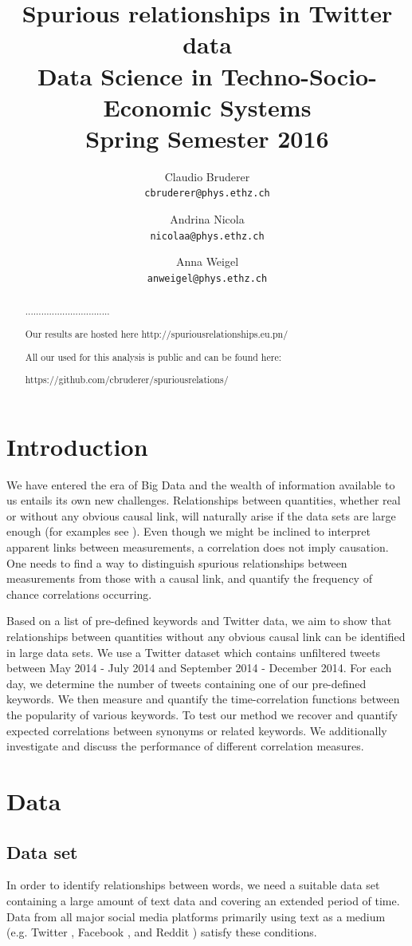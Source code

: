 \documentclass[12pt, a4paper]{article}
\author{
	Claudio Bruderer\\
	\texttt{cbruderer@phys.ethz.ch}
	\and
	Andrina Nicola\\
	\texttt{nicolaa@phys.ethz.ch}
	\and
	Anna Weigel\\
	\texttt{anweigel@phys.ethz.ch}
}
\title{Spurious relationships in Twitter data\\
	 	 \large Data Science in Techno-Socio-Economic Systems\\
	 	 \large Spring Semester 2016}
\begin{document}
\date{}
\maketitle

\begin{abstract}
................................

Our results are hosted here http://spuriousrelationships.eu.pn/


All our used for this analysis is public and can be found here:

https://github.com/cbruderer/spuriousrelations/
\end{abstract}


\vspace{0.2in}

\section{Introduction}
We have entered the era of Big Data and the wealth of information available to us entails its own new challenges. Relationships between quantities, whether real or without any obvious causal link, will naturally arise if the data sets are large enough (for examples see \cite{tyler_vigen}). Even though we might be inclined to interpret apparent links between measurements, a correlation does not imply causation. One needs to find a way to distinguish spurious relationships between measurements from those with a causal link, and quantify the frequency of chance correlations occurring.

Based on a list of pre-defined keywords and Twitter data, we aim to show that relationships between quantities without any obvious causal link can be identified in large data sets. 
We use a Twitter dataset which contains unfiltered tweets between May 2014 - July 2014 and September 2014 - December 2014. For each day, we determine the number of tweets containing one of our pre-defined keywords. We then measure and quantify the time-correlation functions between the popularity of various keywords. To test our method we recover and quantify expected correlations between synonyms or related keywords. We  additionally investigate and discuss the performance of different correlation measures.

\section{Data}
\subsection{Data set}
In order to identify relationships between words, we need a suitable data set containing a large amount of text data and covering an extended period of time. Data from all major social media platforms primarily using text as a medium (e.g. Twitter \cite{twitter}, Facebook \cite{facebook}, and Reddit \cite{reddit}) satisfy these conditions.
\end{document}

